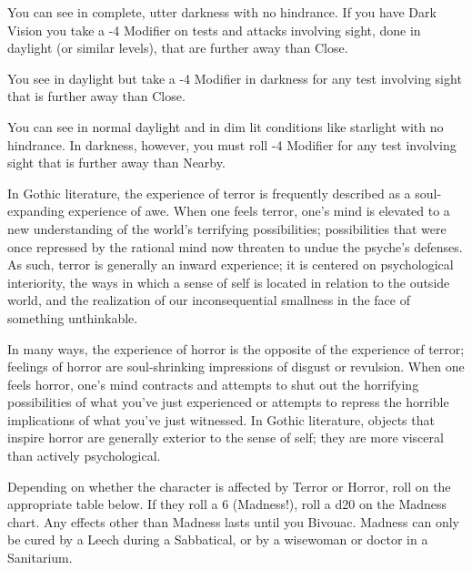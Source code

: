{     

  You can see in complete, utter darkness with no hindrance.  If you have Dark Vision you take a -4 Modifier on tests and attacks involving sight, done in daylight (or similar levels), that are further away than Close. 


  You see in daylight but take a -4 Modifier in darkness for any test involving sight that is further away than Close. 


  You can see in normal daylight and in dim lit conditions like starlight with no hindrance. In darkness, however, you must roll -4 Modifier for any test involving sight that is further away than Nearby.


   

  In Gothic literature, the experience of terror is frequently described as a soul-expanding experience of awe. When one feels terror, one's mind is elevated to a new understanding of the world's terrifying possibilities; possibilities that were once repressed by the rational mind now threaten to undue the psyche's defenses. As such, terror is generally an inward experience; it is centered on psychological interiority, the ways in which a sense of self is located in relation to the outside world, and the realization of our inconsequential smallness in the face of something unthinkable.

  In many ways, the experience of horror is the opposite of the experience of terror; feelings of horror are soul-shrinking impressions of disgust or revulsion. When one feels horror, one's mind contracts and attempts to shut out the horrifying possibilities of what you've just experienced or attempts to repress the horrible implications of what you've just witnessed. In Gothic literature, objects that inspire horror are generally exterior to the sense of self; they are more visceral than actively psychological.


  Depending on whether the character is affected by Terror or Horror, roll on the appropriate table below.  If they roll a 6 (Madness!), roll a d20 on the Madness chart.  Any effects other than Madness lasts until you Bivouac. Madness can only be cured by a Leech during a Sabbatical, or by a wisewoman or doctor in a Sanitarium. 

}
